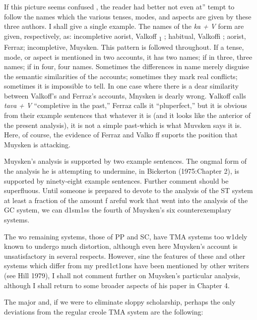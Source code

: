 If this picture seems confused , the reader had better not even at'' tempt to follow the names which the various tenses, modes, and aspects are given by these three authors. I shall give a single example. The names of the \textit{ka} \textit{+} \textit{V} form are given, respectively, as: incompletive aorist, Valkoff \textsubscript{1} ; habitual, Valkoffi ; aorist, Ferraz; incompletive, Muysken. This pattern is followed throughout. If a tense, mode, or aspect is mentioned in two accounts, it has two names; if in three, three names; if in four, four names. Sometimes the differences in name merely disguise the semantic similarities of the accounts; sometimes they mark real conflicts; sometimes it is impossible to tell. In one case where there is a dear similarity between Valkoff's and Ferraz's accounts, Mnysken is dearly wrong. ¥alkoff calls \textit{tava} \textit{+} \textit{V} ``completive
in the past,'' Ferraz calls it ``pluperfect,'' but it is obvious from their example sentences that whatever it is (and it looks like the anterior of the present analysis), it is not a simple past-which is what Muvsken says it is. Here, of course, the evidence of Ferraz and Valko ff suports the position that Muysken is attacking.

Muysken's analysis is supported by two example sentences. The ongmal form of the analysis he is attempting to undermine, in Bicker\-ton (1975:Chapter 2), is supported by ninety-eight example sentences. Further comment should be superfluous. Until someone is prepared to devote to the analysis of the ST system at least a fraction of the amount f areful work that went into the analysis of the GC system, we can d1sm1ss the fourth of Muysken's six counterexemplary systems.

The wo remaining systems, those of PP and SC, have TMA sys\-tems too w1dely known to undergo much distortion, although even here Muysken's account is unsatisfactory in several respects. However, sine the features of these and other systems which differ from my pred1ct1ons have been mentioned by other writers (see Hill 1979), I shall not comment further on Muysken's particular analysis, although I shall return to some broader aspects of his paper in Chapter 4.

The major and, if we were to eliminate sloppy scholarship,
perhaps the only deviations from the regular creole TMA system are the following:

